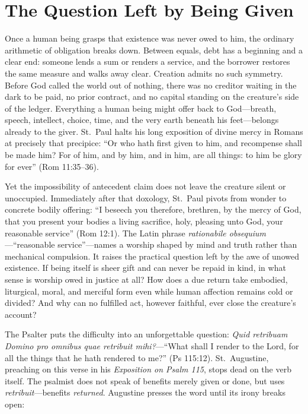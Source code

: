 \section{The Question Left by Being Given}

Once a human being grasps that existence was never owed to him, the ordinary arithmetic of obligation breaks down. Between equals, debt has a beginning and a clear end: someone lends a sum or renders a service, and the borrower restores the same measure and walks away clear. Creation admits no such symmetry. Before God called the world out of nothing, there was no creditor waiting in the dark to be paid, no prior contract, and no capital standing on the creature's side of the ledger. Everything a human being might offer back to God---breath, speech, intellect, choice, time, and the very earth beneath his feet---belongs already to the giver. St.\ Paul halts his long exposition of divine mercy in Romans at precisely that precipice: ``Or who hath first given to him, and recompense shall be made him? For of him, and by him, and in him, are all things: to him be glory for ever'' (Rom 11:35--36).

Yet the impossibility of antecedent claim does not leave the creature silent or unoccupied. Immediately after that doxology, St.\ Paul pivots from wonder to concrete bodily offering: ``I beseech you therefore, brethren, by the mercy of God, that you present your bodies a living sacrifice, holy, pleasing unto God, your reasonable service'' (Rom 12:1). The Latin phrase \emph{rationabile obsequium}---``reasonable service''---names a worship shaped by mind and truth rather than mechanical compulsion. It raises the practical question left by the awe of unowed existence. If being itself is sheer gift and can never be repaid in kind, in what sense is worship owed in justice at all? How does a due return take embodied, liturgical, moral, and merciful form even while human affection remains cold or divided? And why can no fulfilled act, however faithful, ever close the creature's account?

The Psalter puts the difficulty into an unforgettable question: \emph{Quid retribuam Domino pro omnibus quae retribuit mihi?}---``What shall I render to the Lord, for all the things that he hath rendered to me?'' (Ps 115:12). St.\ Augustine, preaching on this verse in his \emph{Exposition on Psalm 115}, stops dead on the verb itself. The psalmist does not speak of benefits merely given or done, but uses \emph{retribuit}---benefits \emph{returned}. Augustine presses the word until its irony breaks open:

